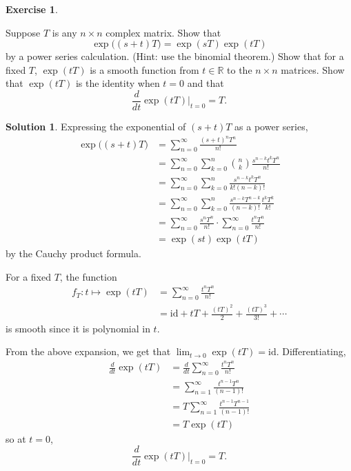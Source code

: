 \documentclass[11pt, a4paper]{report}
\theoremstyle{definition}
\newtheorem{ex}{Exercise}[part]
\newtheorem{sol}{Solution}[part]
\begin{document}
\begin{ex}\label{ex:exptTidentities}

Suppose $T$ is any $n \times n$ complex matrix. Show that
\[
    \exp\bigl( (s + t) T \bigr) = \exp(sT) \exp(tT)
\]
by a power series calculation. (Hint: use the binomial theorem.)
Show that for a fixed $T$, $\exp(tT)$ is a smooth function from $t \in \mathbb{R}$ to the $n \times n$ matrices.
Show that $\exp(tT)$ is the identity when $t = 0$ and that
\[
    \frac{d}{dt} \exp(tT) \Big|_{t = 0} = T.
\]

\end{ex}

\begin{sol}

Expressing the exponential of $(s + t)T$ as a power series,
\begin{align*}
    \exp\bigl( (s + t) T \bigr) &= \sum_{n = 0}^\infty \frac{{(s + t)}^n T^n}{n!} \\
        &= \sum_{n = 0}^\infty \sum_{k = 0}^n \binom{n}{k} \frac{s^{n - k} t^k T^n}{n!} \\
        &= \sum_{n = 0}^\infty \sum_{k = 0}^n \frac{s^{n - k} t^k T^n}{k! (n - k)!} \\
        &= \sum_{n = 0}^\infty \sum_{k = 0}^n \frac{s^{n - k} T^{n - k}}{(n - k)!} \frac{t^k T^k}{k!} \\
        &= \sum_{n = 0}^\infty \frac{s^n T^n}{n!} \cdot \sum_{n = 0}^\infty \frac{t^n T^n}{n!} \\
        &= \exp(st) \exp(tT)
\end{align*}
by the Cauchy product formula.

For a fixed $T$, the function
\begin{align*}
    f_T: t \mapsto \exp(tT) &= \sum_{n = 0}^\infty \frac{{t^n}T^n}{n!} \\
        &= \text{id} + tT + \frac{{(tT)}^2}{2} + \frac{{(tT)}^3}{3!} + \cdots
\end{align*}
is smooth since it is polynomial in $t$.

From the above expansion, we get that $\displaystyle \lim_{t \to 0} \exp(tT) = \text{id}$.
Differentiating,
\begin{align*}
    \frac{d}{dt} \exp(tT) &= \frac{d}{dt} \sum_{n = 0}^\infty \frac{{t^n}T^n}{n!} \\
        &= \sum_{n = 1}^\infty \frac{t^{n - 1} T^n}{(n - 1)!} \\
        &= T \sum_{n = 1}^\infty \frac{t^{n - 1} T^{n - 1}}{(n - 1)!} \\
        &= T \exp(tT)
\end{align*}
so at $t = 0$,
\[
    \frac{d}{dt} \exp(tT) \Big|_{t = 0} = T.
\]

\end{sol}
\end{document}
